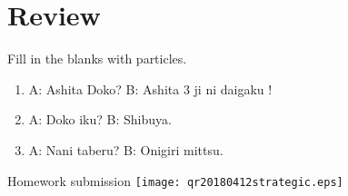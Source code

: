 \documentclass[uplatex,a4paper]{jsarticle}
\begin{document}
\section{Review}

Fill in the blanks with particles.

\begin{enumerate}
 \item A: Ashita Doko? B: Ashita 3 ji ni daigaku \underline{\hspace{4em}}!
 \item A: Doko \underline{\hspace{4em}} iku? B: Shibuya.
 \item A: Nani \underline{\hspace{4em}} taberu? B: Onigiri mittsu.
\end{enumerate}

\ifQR
\vspace*{-6\baselineskip}
\begin{flushright}
Homework submission \texttt{[image: qr20180412strategic.eps]}
\end{flushright}
\fi%
\end{document}
